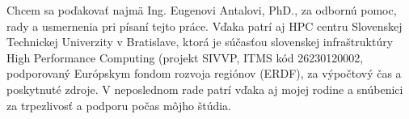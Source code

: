 Chcem sa poďakovať najmä Ing. Eugenovi Antalovi, PhD., za odbornú pomoc, rady a usmernenia pri písaní tejto práce.
Vďaka patrí aj HPC centru Slovenskej Technickej Univerzity v Bratislave,
ktorá je súčasťou slovenskej infraštruktúry High Performance Computing (projekt SIVVP, ITMS kód 26230120002,
podporovaný Európskym fondom rozvoja regiónov (ERDF), za výpočtový čas a poskytnuté zdroje.
V neposlednom rade patrí vďaka aj mojej rodine a snúbenici za trpezlivosť a podporu počas môjho štúdia.
